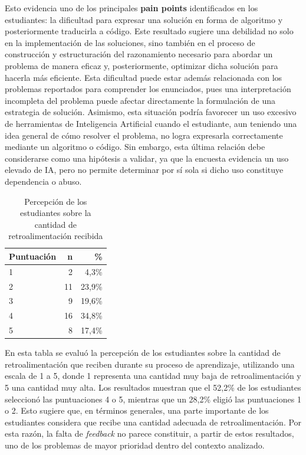 \documentclass[letterpaper, 10 pt, conference]{ieeeconf}
\begin{document}
Esto evidencia uno de los principales \textbf{pain points} identificados en los estudiantes: la dificultad para expresar una solución en forma de algoritmo y posteriormente traducirla a código. Este resultado sugiere una debilidad no solo en la implementación de las soluciones, sino también en el proceso de construcción y estructuración del razonamiento necesario para abordar un problema de manera eficaz y, posteriormente, optimizar dicha solución para hacerla más eficiente. Esta dificultad puede estar además relacionada con los problemas reportados para comprender los enunciados, pues una interpretación incompleta del problema puede afectar directamente la formulación de una estrategia de solución. Asimismo, esta situación podría favorecer un uso excesivo de herramientas de Inteligencia Artificial cuando el estudiante, aun teniendo una idea general de cómo resolver el problema, no logra expresarla correctamente mediante un algoritmo o código. Sin embargo, esta última relación debe considerarse como una hipótesis a validar, ya que la encuesta evidencia un uso elevado de IA, pero no permite determinar por sí sola si dicho uso constituye dependencia o abuso.

\begin{table}[ht]
	\centering
	\caption{Percepción de los estudiantes sobre la cantidad de retroalimentación recibida}
	\label{tab:feedback}
	\begin{tabular}{lrr}
		\hline
		\textbf{Puntuación} & \textbf{n} & \textbf{\%} \\
		\hline
		1 & 2  & 4,3\% \\
		2 & 11 & 23,9\% \\
		3 & 9  & 19,6\% \\
		4 & 16 & 34,8\% \\
		5 & 8  & 17,4\% \\
		\hline
	\end{tabular}
\end{table}

En esta tabla se evaluó la percepción de los estudiantes sobre la cantidad de retroalimentación que reciben durante su proceso de aprendizaje, utilizando una escala de 1 a 5, donde 1 representa una cantidad muy baja de retroalimentación y 5 una cantidad muy alta. Los resultados muestran que el 52,2\% de los estudiantes seleccionó las puntuaciones 4 o 5, mientras que un 28,2\% eligió las puntuaciones 1 o 2. Esto sugiere que, en términos generales, una parte importante de los estudiantes considera que recibe una cantidad adecuada de retroalimentación. Por esta razón, la falta de \textit{feedback} no parece constituir, a partir de estos resultados, uno de los problemas de mayor prioridad dentro del contexto analizado.
\end{document}
